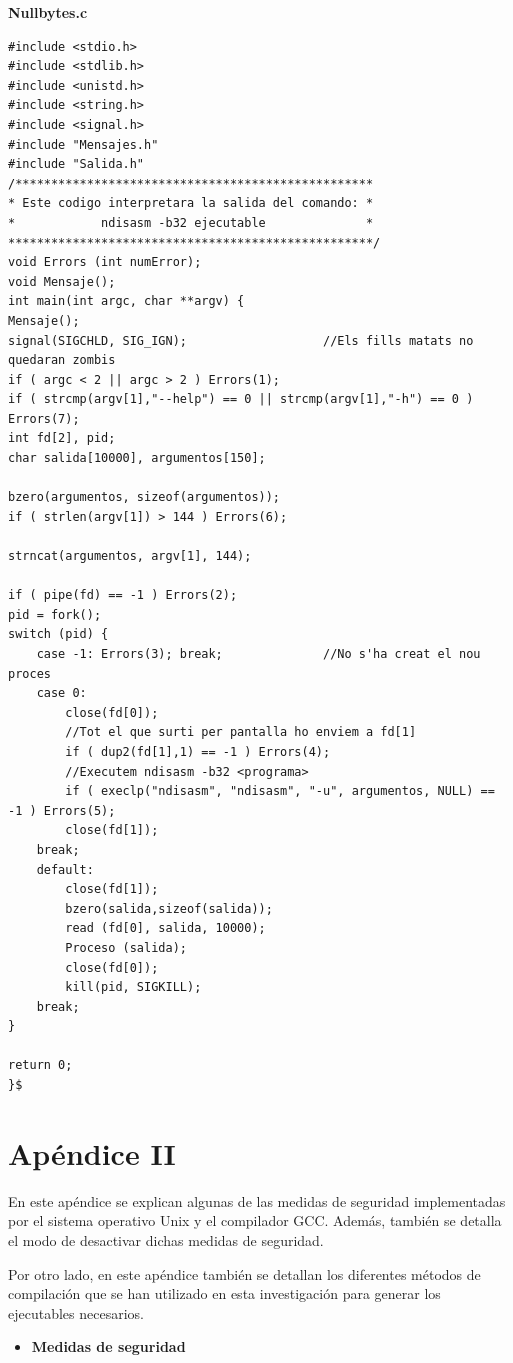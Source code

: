 \documentclass [titlepage, 12pt]{article}
\begin{document}
\textbf{Nullbytes.c}
\lstset{language=C++,caption=Nullbytes.C}
\begin{lstlisting}
#include <stdio.h>
#include <stdlib.h>
#include <unistd.h>
#include <string.h>
#include <signal.h>
#include "Mensajes.h"
#include "Salida.h"
/**************************************************
* Este codigo interpretara la salida del comando: *
*            ndisasm -b32 ejecutable              *
***************************************************/
void Errors (int numError);
void Mensaje();
int main(int argc, char **argv) {
Mensaje();
signal(SIGCHLD, SIG_IGN);					//Els fills matats no quedaran zombis
if ( argc < 2 || argc > 2 ) Errors(1);
if ( strcmp(argv[1],"--help") == 0 || strcmp(argv[1],"-h") == 0 ) Errors(7);
int fd[2], pid;
char salida[10000], argumentos[150];

bzero(argumentos, sizeof(argumentos));
if ( strlen(argv[1]) > 144 ) Errors(6);

strncat(argumentos, argv[1], 144);

if ( pipe(fd) == -1 ) Errors(2);
pid = fork();
switch (pid) {
	case -1: Errors(3); break;				//No s'ha creat el nou proces
	case 0:
		close(fd[0]);
		//Tot el que surti per pantalla ho enviem a fd[1]
		if ( dup2(fd[1],1) == -1 ) Errors(4);
		//Executem ndisasm -b32 <programa>
		if ( execlp("ndisasm", "ndisasm", "-u", argumentos, NULL) == -1 ) Errors(5);
		close(fd[1]);
	break;
	default:
		close(fd[1]);
		bzero(salida,sizeof(salida));
		read (fd[0], salida, 10000);
		Proceso (salida);
		close(fd[0]);
		kill(pid, SIGKILL);
	break;
}

return 0;
}$
\end{lstlisting}

\pagebreak


\section{Ap\'endice II}
\bigskip
En este ap\'endice se explican algunas de las medidas de seguridad implementadas por el sistema operativo Unix y el compilador GCC. Adem\'as, tambi\'en se detalla el modo de desactivar dichas medidas de seguridad. \bigskip

Por otro lado, en este ap\'endice tambi\'en se detallan los diferentes m\'etodos de compilaci\'on que se han utilizado en esta investigaci\'on para generar los ejecutables necesarios.
\bigskip
\begin{itemize}
	\item \textbf{Medidas de seguridad}
\end{itemize}
\end{document}
